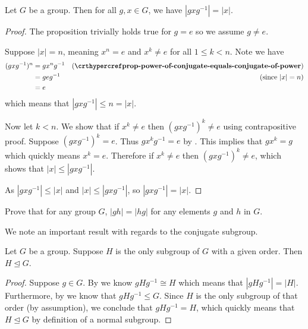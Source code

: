 \begin{proposition}\label{prop-order-of-conjugate-element-equals-order-of-element}
    Let $G$ be a group. Then for all $g, x \in G$, we have $|gxg^{-1}| = |x|$.
\end{proposition}
\begin{proof}
    The proposition trivially holds true for $g = e$ so we assume $g \neq e$.

    Suppose $|x| = n$, meaning $x^n = e$ and $x^k \neq e$ for all $1 \leq k < n$. Note we have
    \begin{align*}
        (gxg^{-1})^n  &= gx^ng^{-1} & (\myref{prop-power-of-conjugate-equals-conjugate-of-power})\\
        &= geg^{-1} & (\text{since } |x| = n)\\
        &= e
    \end{align*}
    which means that $|gxg^{-1}| \leq n = |x|$.

    Now let $k < n$. We show that if $x^k \neq e$ then $(gxg^{-1})^k \neq e$ using contrapositive proof. Suppose $(gxg^{-1})^k = e$. Thus $gx^kg^{-1} = e$ by . This implies that $gx^k = g$ which quickly means $x^k = e$. Therefore if $x^k \neq e$ then $(gxg^{-1})^k \neq e$, which shows that $|x| \leq |gxg^{-1}|$.

    As $|gxg^{-1}| \leq |x|$ and $|x| \leq |gxg^{-1}|$, so $|gxg^{-1}| = |x|$.
\end{proof}

\begin{exercise}
    Prove that for any group $G$, $|gh| = |hg|$ for any elements $g$ and $h$ in $G$.
\end{exercise}

We note an important result with regards to the conjugate subgroup.
\begin{theorem}\label{thrm-unique-subgroup-of-given-order-is-normal}
    Let $G$ be a group. Suppose $H$ is the only subgroup of $G$ with a given order. Then $H \unlhd G$.
\end{theorem}
\begin{proof}
    Suppose $g \in G$. By  we know $gHg^{-1} \cong H$ which means that $|gHg^{-1}| = |H|$. Furthermore, by  we know that $gHg^{-1} \leq G$. Since $H$ is the only subgroup of that order (by assumption), we conclude that $gHg^{-1} = H$, which quickly means that $H \unlhd G$ by definition of a normal subgroup.
\end{proof}

